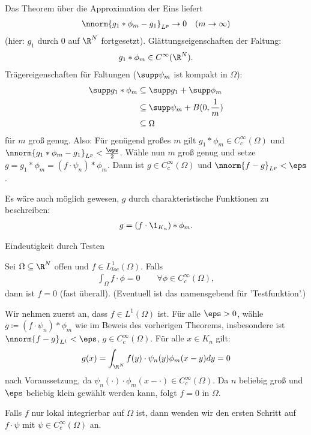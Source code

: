 \begin{beweis}
\begin{enumerate}
Das Theorem über die Approximation der Eins liefert
\begin{align*}
  \nnorm {g_{1}* \phi_{m} - g_{1}}_{L^{p}} \to 0 \quad (m \to \infty)
\end{align*}
(hier: $g_{1}$ durch $0$ auf $\R^{N}$ fortgesetzt). Glättungseigenschaften der Faltung:
\begin{align*}
  g_{1} * \phi_{m} \in C^{\infty}(\R^{N}). 
\end{align*}
Trägereigenschaften für Faltungen ($\supp \psi_{m}$ ist kompakt in $\Omega$):
\begin{align*}
  \supp g_{1}* \phi_{m} &\subseteq \supp g_{1} + \supp \phi_{m}\\
&\subseteq \supp \psi_{m} + B(0, \frac 1 m)\\
& \subseteq \Omega
\end{align*}
für $m$ groß genug. Also: Für genügend großes $m$ gilt $g_{1}* \phi_{m} \in C_{c}^{\infty}(\Omega)$ und $\nnorm{g_{1}*\phi_{m} - g_{1}}_{L^{p}} < \frac \eps 2$. Wähle nun $m$ groß genug und setze $g = g_{1} * \phi_{m} = (f\cdot \psi_{n})*\phi_{m}$. Dann ist $g \in C_{c}^{\infty}(\Omega)$ und $\nnorm{f - g}_{L^{p}} < \eps$. 
  \end{enumerate}
 \end{beweis}

Es wäre auch möglich gewesen, $g$ durch charakteristische Funktionen zu beschreiben:
\begin{align*}
 g =  (f\cdot \1_{K_{n}})* \phi_{m}. 
\end{align*}
\begin{theorem}Eindeutigkeit durch Testen 

Sei $\Omega \subseteq \R^{N}$ offen und $f \in L^{1}_{loc}(\Omega)$. Falls
\begin{align*}
  \int_{\Omega} f\cdot\phi = 0 \qquad \forall \phi \in C_{c}^{\infty}(\Omega), 
\end{align*}
dann ist $f = 0$ (fast überall). 
(Eventuell ist das namensgebend für 'Testfunktion'.)
\end{theorem}
\begin{beweis}
  Wir nehmen zuerst an, dass $f \in L^{1}(\Omega)$ ist. Für alle $\eps> 0$, wähle $g\coloneqq (f\cdot \psi_{n}) *\phi_{m}$ wie im Beweis des vorherigen Theorems, insbesondere ist $\nnorm{f - g}_{L^{1}} < \eps$, $g \in C_{c}^{\infty}(\Omega)$. Für alle $x \in K_{n}$ gilt:
  \begin{align*}
    g(x) = \int_{\R^{N}}f(y) \cdot\psi_{n}(y)\phi_{m}(x - y) dy = 0
  \end{align*}
nach Voraussetzung, da $\psi_{n}(\cdot) \cdot \phi_{m}(x - \cdot) \in C_{c}^{\infty}(\Omega)$. Da $n$ beliebig groß und $\eps$ beliebig klein gewählt werden kann, folgt $f = 0$ in $\Omega$. 
\vspace{5mm}

Falls $f$ nur lokal integrierbar auf $\Omega$ ist, dann wenden wir den ersten Schritt auf $f\cdot\psi$ mit $\psi \in C_{c}^{\infty}(\Omega)$ an. 
\end{beweis}

